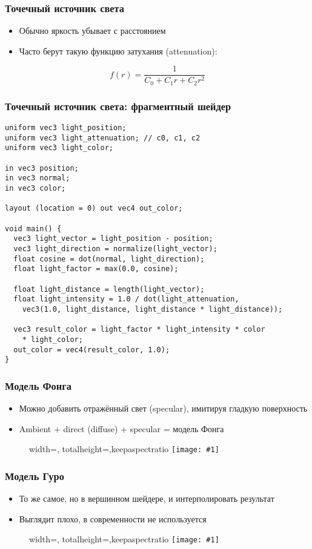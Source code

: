 \documentclass{beamer}
\newcommand{\slideimage}[1]{
  \begin{figure}
    \begin{adjustbox}{width=\textwidth, totalheight=\textheight-2\baselineskip-2\baselineskip,keepaspectratio}
      \texttt{[image: \#1]}
    \end{adjustbox}
  \end{figure}
}
\begin{document}
\begin{frame}[fragile]
\frametitle{Точечный источник света}
\begin{itemize}
\item Обычно яркость убывает с расстоянием
\pause
\item Часто берут такую функцию затухания (attenuation):
\end{itemize}
\begin{equation}
f(r) = \frac{1}{C_0 + C_1 r + C_2 r^2}
\end{equation}
\end{frame}

\begin{frame}[fragile]
\frametitle{Точечный источник света: фрагментный шейдер}
\fontsize{10pt}{10pt}
\begin{verbatim}
uniform vec3 light_position;
uniform vec3 light_attenuation; // c0, c1, c2
uniform vec3 light_color;

in vec3 position;
in vec3 normal;
in vec3 color;

layout (location = 0) out vec4 out_color;

void main() {
  vec3 light_vector = light_position - position;
  vec3 light_direction = normalize(light_vector);
  float cosine = dot(normal, light_direction);
  float light_factor = max(0.0, cosine);

  float light_distance = length(light_vector);
  float light_intensity = 1.0 / dot(light_attenuation, 
    vec3(1.0, light_distance, light_distance * light_distance));

  vec3 result_color = light_factor * light_intensity * color
    * light_color;
  out_color = vec4(result_color, 1.0);
}
\end{verbatim}
\end{frame}

\begin{frame}[fragile]
\frametitle{Модель Фонга}
\begin{itemize}
\item Можно добавить отражённый свет (specular), имитируя гладкую поверхность
\pause
\item Ambient + direct (diffuse) + specular = модель Фонга
\end{itemize}
\slideimage{phong.png}
\end{frame}

\begin{frame}[fragile]
\frametitle{Модель Гуро}
\begin{itemize}
\item То же самое, но в вершинном шейдере, и интерполировать результат
\item Выглядит плохо, в современности не используется
\end{itemize}
\slideimage{gourand.png}
\end{frame}
\end{document}
